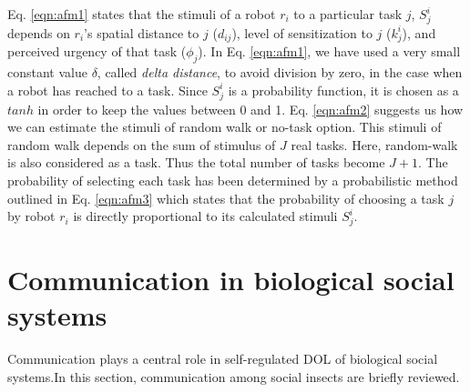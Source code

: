 \documentclass{intech}
\begin{document}
Eq. \ref{eqn:afm1} states that the stimuli of a robot $r_i$ to a particular task $j$, $S^{i}_{j}$ depends on $r_i$'s spatial distance to $j$ ($d_{ij}$), level of sensitization to $j$ ($k_{j}^{i}$), and perceived urgency of that task ($\phi _{j}$). In  Eq. \ref{eqn:afm1}, we have used a very small constant value $\delta$, called {\em delta distance}, to avoid division by zero, in the case when a robot has reached to a task. Since $S^{i}_{j}$ is a probability function, it is chosen as a $tanh$ in order to keep the values between 0 and 1. Eq. \ref{eqn:afm2} suggests us how we can estimate the stimuli of random walk or no-task option. This stimuli of random walk depends on the sum of stimulus of $J$ real tasks. Here, random-walk is also considered as a task. Thus the total number of tasks become $J+1$. The probability of selecting each task has been determined by a probabilistic method outlined in Eq. \ref{eqn:afm3} which states that the probability of choosing a task $j$ by robot $r_i$ is directly proportional to its calculated stimuli $ S^i_j$. 
\section{Communication in biological social systems}
\label{bio-comm}
Communication plays a central role in self-regulated DOL of biological social systems.In this section, communication among  social insects are briefly reviewed.
%
\end{document}
